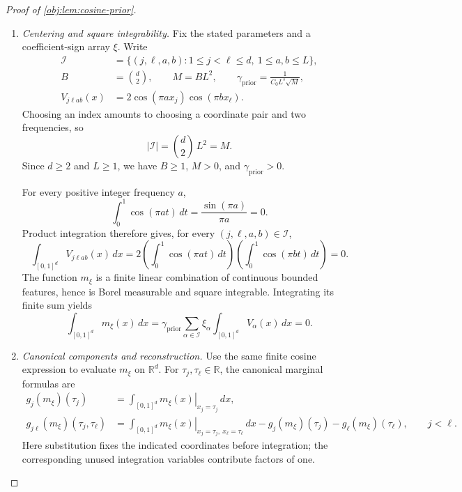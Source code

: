 \begin{proof}[Proof of \cref{obj:lem:cosine-prior}]
\begin{enumerate}
\item \emph{Centering and square integrability.}
Fix the stated parameters and a coefficient-sign array \(\xi\). Write
\[
\begin{aligned}
\mathcal I
&=\{(j,\ell,a,b):1\leq j<\ell\leq d,\ 1\leq a,b\leq L\},\\
B&=\binom d2,\qquad M=BL^2,\qquad
\gamma_{\mathrm{prior}}=\frac{1}{C_0L^s\sqrt M},\\
V_{j\ell ab}(x)
&=2\cos(\pi a x_j)\cos(\pi b x_\ell).
\end{aligned}
\]
Choosing an index amounts to choosing a coordinate pair and two frequencies, so
\[
|\mathcal I|=\binom d2\,L^2=M.
\]
Since \(d\geq2\) and \(L\geq1\), we have \(B\geq1\), \(M>0\), and
\(\gamma_{\mathrm{prior}}>0\).

For every positive integer frequency \(a\),
\[
\int_0^1\cos(\pi a t)\,dt
=\frac{\sin(\pi a)}{\pi a}=0.
\]
Product integration therefore gives, for every \((j,\ell,a,b)\in\mathcal I\),
\[
\int_{[0,1]^d}V_{j\ell ab}(x)\,dx
=2\left(\int_0^1\cos(\pi a t)\,dt\right)
  \left(\int_0^1\cos(\pi b t)\,dt\right)
=0.
\]
The function \(m_\xi\) is a finite linear combination of continuous bounded
features, hence is Borel measurable and square integrable. Integrating its
finite sum yields
\[
\int_{[0,1]^d}m_\xi(x)\,dx
=\gamma_{\mathrm{prior}}
  \sum_{\alpha\in\mathcal I}\xi_\alpha
  \int_{[0,1]^d}V_\alpha(x)\,dx
=0.
\]

\item \emph{Canonical components and reconstruction.}
Use the same finite cosine expression to evaluate \(m_\xi\) on
\(\mathbb R^d\). For \(\tau_j,\tau_\ell\in\mathbb R\), the canonical marginal
formulas are
\[
\begin{aligned}
g_j(m_\xi)(\tau_j)
&=\int_{[0,1]^d}
  \left.m_\xi(x)\right|_{x_j=\tau_j}\,dx,\\
g_{j\ell}(m_\xi)(\tau_j,\tau_\ell)
&=\int_{[0,1]^d}
  \left.m_\xi(x)\right|_{x_j=\tau_j,\ x_\ell=\tau_\ell}\,dx
  -g_j(m_\xi)(\tau_j)-g_\ell(m_\xi)(\tau_\ell),
  \qquad j<\ell.
\end{aligned}
\]
Here substitution fixes the indicated coordinates before integration; the
corresponding unused integration variables contribute factors of one.


\end{enumerate}
\end{proof}
